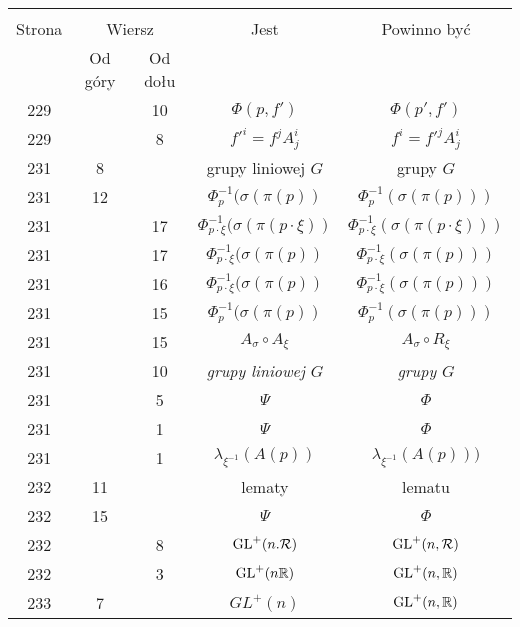 \documentclass[a4paper,11pt]{article}
\begin{document}
\begin{center}
  \begin{tabular}{|c|c|c|c|c|}
    \hline
    & \multicolumn{2}{c|}{} & & \\
    Strona & \multicolumn{2}{c|}{Wiersz} & Jest
                              & Powinno być \\ \cline{2-3}
    & Od góry & Od dołu & & \\
    \hline
    229 & & 10 & $\Phi( p, f' )$ & $\Phi( p', f' )$ \\
    229 & &  8 & $f'^{ i } = f^{ j } A^{ i }_{ j }$
           & $f^{ i } = f'^{ j } A^{ i }_{ j }$ \\
    231 &  8 & & grupy liniowej $G$ & grupy $G$ \\[0.5em]
    231 & 12 & & $\Phi^{ -1 }_{ p }( \sigma( \pi( p ) )$
           & $\Phi^{ -1 }_{ p }( \sigma( \pi( p ) ) )$ \\[0.5em]
    231 & & 17 & $\Phi^{ -1 }_{ p \cdot \xi }( \sigma( \pi( p \cdot \xi ) )$
           & $\Phi^{ -1 }_{ p \cdot \xi }( \sigma( \pi( p \cdot \xi ) ) )$ \\[0.5em]
    231 & & 17 & $\Phi^{ -1 }_{ p \cdot \xi }( \sigma( \pi( p ) )$
           & $\Phi^{ -1 }_{ p \cdot \xi }( \sigma( \pi( p ) ) )$ \\[0.5em]
    231 & & 16 & $\Phi^{ -1 }_{ p \cdot \xi }( \sigma( \pi( p ) )$
           & $\Phi^{ -1 }_{ p \cdot \xi }( \sigma( \pi( p ) ) )$ \\[0.5em]
    231 & & 15 & $\Phi^{ -1 }_{ p }( \sigma( \pi( p ) )$
           & $\Phi^{ -1 }_{ p }( \sigma( \pi( p ) ) )$ \\[0.3em]
    231 & & 15 & $A_{ \sigma } \circ A_{ \xi }$
           & $A_{ \sigma } \circ R_{ \xi }$ \\
    231 & & 10 & \textit{grupy liniowej $G$} & \textit{grupy $G$} \\
    231 & &  5 & $\Psi$ & $\Phi$ \\
    231 & &  1 & $\Psi$ & $\Phi$ \\
    231 & &  1 & $\lambda_{ \xi^{ -1 } }( A( p ) )$
           & $\lambda_{ \xi^{ -1 } }( A( p ) ) )$ \\
    232 & 11 & & lematy & lematu \\
    232 & 15 & & $\Psi$ & $\Phi$ \\
    232 & & 8 & $\mathrm{GL}^{ + }( n. \mathcal{R} )$ & $\mathrm{GL}^{ + }( n, \mathcal{R} )$ \\
    232 & & 3 & $\mathrm{GL}^{ + }( n \mathbb{R} )$ & $\mathrm{GL}^{ + }( n, \mathbb{R} )$ \\
    233 &  7 & & $GL^{ + }( n )$ & $\mathrm{GL}^{ + }( n, \mathbb{R} )$ \\

\end{tabular}
\end{center}
\end{document}
